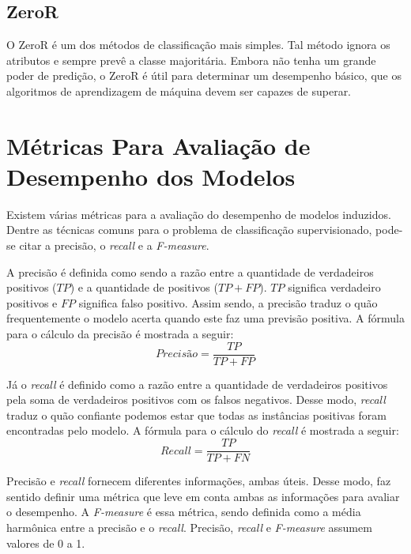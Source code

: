 \subsection{ZeroR}
O ZeroR é um dos métodos de classificação mais simples. Tal método ignora os
atributos e sempre prevê a classe majoritária. Embora não tenha um grande poder de
predição, o ZeroR é útil para determinar um desempenho básico, que os algoritmos de
aprendizagem de máquina devem ser capazes de superar. 

\section{Métricas Para Avaliação de Desempenho dos Modelos}
Existem várias métricas para a avaliação do desempenho de modelos induzidos. Dentre
as técnicas comuns para o problema de classificação supervisionado, pode-se citar a
precisão, o \textit{recall} e a \textit{F-measure}.  

\par A precisão é definida como sendo a razão entre a quantidade de verdadeiros
positivos ($TP$) e a quantidade de positivos ($TP + FP$). $TP$ significa verdadeiro
positivos e $FP$ significa falso positivo. Assim sendo, a precisão traduz o quão
frequentemente o modelo acerta quando este faz uma previsão positiva.  A fórmula para
o cálculo da precisão é mostrada a seguir: 
\begin{equation}
    Precisão = \frac{TP}{TP + FP}
\end{equation}

Já o \textit{recall} é definido como a razão entre a quantidade de verdadeiros
positivos pela soma de verdadeiros positivos com os falsos negativos. Desse modo,
\textit{recall} traduz o quão confiante podemos estar que todas as instâncias
positivas foram encontradas pelo modelo. A fórmula para o cálculo do \textit{recall} é
mostrada a seguir: 
\begin{equation}
    Recall = \frac{TP}{TP + FN}
\end{equation}

\par Precisão e \textit{recall} fornecem diferentes informações, ambas 
úteis. Desse modo, faz sentido definir uma métrica que leve em conta ambas as
informações para avaliar o desempenho. A \textit{F-measure} é essa métrica, sendo
definida como a média harmônica entre a precisão e o \textit{recall}. Precisão,
\textit{recall} e \textit{F-measure} assumem valores de 0 a 1.
